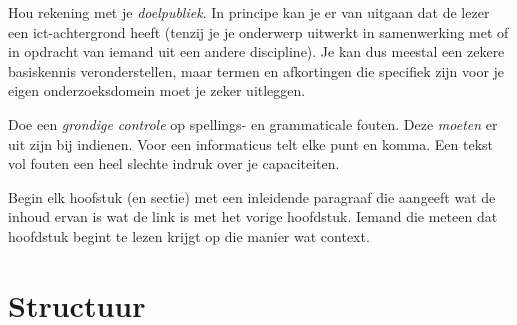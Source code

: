 

%

Hou rekening met je \emph{doelpubliek}. In principe kan je er van uitgaan dat de lezer een ict-achtergrond heeft (tenzij je je onderwerp uitwerkt in samenwerking met of in opdracht van iemand uit een andere discipline). Je kan dus meestal een zekere basiskennis veronderstellen, maar termen en afkortingen die specifiek zijn voor je eigen onderzoeksdomein moet je zeker uitleggen.

Doe een \emph{grondige controle} op spellings- en grammaticale fouten. Deze \emph{moeten} er uit zijn bij indienen. Voor een informaticus telt elke punt en komma. Een tekst vol fouten een heel slechte indruk over je capaciteiten.

Begin elk hoofstuk (en sectie) met een inleidende paragraaf die aangeeft wat de inhoud ervan is wat de link is met het vorige hoofdstuk. Iemand die meteen dat hoofdstuk begint te lezen krijgt op die manier wat context.




%

\section{Structuur}
\label{sec:structuur}

